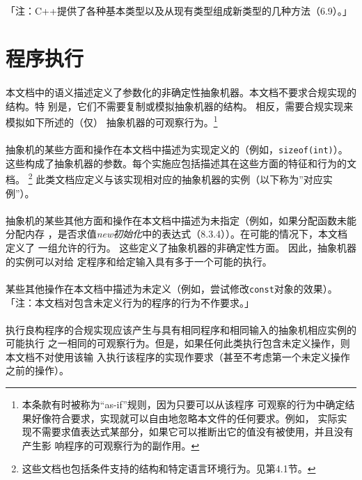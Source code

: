 \paragraph{}
「注：C++提供了各种基本类型以及从现有类型组成新类型的几种方法（6.9）。」

\section{程序执行}

\paragraph{}
本文档中的语义描述定义了参数化的非确定性抽象机器。本文档不要求合规实现的结构。特
别是，它们不需要复制或模拟抽象机器的结构。 相反，需要合规实现来模拟如下所述的（仅）
抽象机器的可观察行为。\footnote{本条款有时被称为“as-if”规则，因为只要可以从该程序
可观察的行为中确定结果好像符合要求，实现就可以自由地忽略本文件的任何要求。例如，
实际实现不需要求值表达式某部分，如果它可以推断出它的值没有被使用，并且没有产生影
响程序的可观察行为的副作用。}

\paragraph{}
抽象机的某些方面和操作在本文档中描述为实现定义的（例如，\texttt{sizeof(int)}）。
这些构成了抽象机器的参数。每个实施应包括描述其在这些方面的特征和行为的文档。
\footnote{这些文档也包括条件支持的结构和特定语言环境行为。见第4.1节。}
此类文档应定义与该实现相对应的抽象机器的实例（以下称为”对应实例”）。

\paragraph{}
抽象机的某些其他方面和操作在本文档中描述为未指定（例如，如果分配函数未能分配内存
，是否求值\textit{new初始化}中的表达式（8.3.4））。在可能的情况下，本文档定义了
一组允许的行为。 这些定义了抽象机器的非确定性方面。 因此，抽象机器的实例可以对给
定程序和给定输入具有多于一个可能的执行。

\paragraph{}
某些其他操作在本文档中描述为未定义（例如，尝试修改\texttt{const}对象的效果）。
「注：本文档对包含未定义行为的程序的行为不作要求。」

\paragraph{}
执行良构程序的合规实现应该产生与具有相同程序和相同输入的抽象机相应实例的可能执行
之一相同的可观察行为。但是，如果任何此类执行包含未定义操作，则本文档不对使用该输
入执行该程序的实现作要求（甚至不考虑第一个未定义操作之前的操作）。


